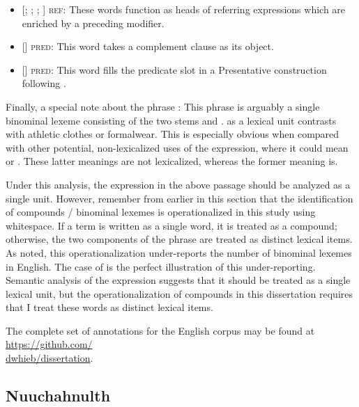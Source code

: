 \begin{itemize}
  \item {[; ; ; ]} \textsc{ref:} These words function as heads of referring expressions which are enriched by a preceding modifier.
  \item {[]} \textsc{pred:} This word takes a complement clause as its object.
  \item {[]} \textsc{pred:} This word fills the predicate slot in a Presentative \parencite[1408]{Quirketal1985} construction following .
\end{itemize}

Finally, a special note about the phrase : This phrase is arguably a single binominal lexeme consisting of the two stems  and .  as a lexical unit contrasts with athletic clothes or formalwear. This is especially obvious when compared with other potential, non-lexicalized uses of the expression, where it could mean  or . These latter meanings are not lexicalized, whereas the former meaning is.

Under this analysis, the expression  in the above passage should be analyzed as a single unit. However, remember from earlier in this section that the identification of compounds / binominal lexemes is operationalized in this study using whitespace. If a term is written as a single word, it is treated as a compound; otherwise, the two components of the phrase are treated as distinct lexical items. As noted, this operationalization under-reports the number of binominal lexemes in English. The case of  is the perfect illustration of this under-reporting. Semantic analysis of the expression  suggests that it should be treated as a single lexical unit, but the operationalization of compounds in this dissertation requires that I treat these words as distinct lexical items.

The complete set of annotations for the English corpus may be found at \href{https://github.com/dwhieb/dissertation}{https://github.com/\\dwhieb/dissertation}.

\subsection{Nuuchahnulth}
\label{sec:3.3.3}

